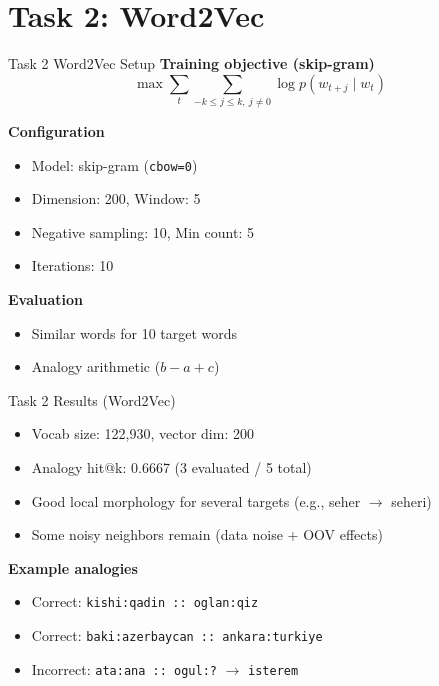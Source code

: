 \documentclass{beamer}
\begin{document}
\section{Task 2: Word2Vec}

\begin{frame}{Task 2 Word2Vec Setup}
\small
\textbf{Training objective (skip-gram)}
\[
\max \sum_{t}\sum_{-k \le j \le k,\ j\neq0} \log p(w_{t+j}\mid w_t)
\]

\vspace{0.4em}
\textbf{Configuration}
\begin{itemize}
  \item Model: skip-gram (\texttt{cbow=0})
  \item Dimension: 200, Window: 5
  \item Negative sampling: 10, Min count: 5
  \item Iterations: 10
\end{itemize}

\textbf{Evaluation}
\begin{itemize}
  \item Similar words for 10 target words
  \item Analogy arithmetic (\(b-a+c\))
\end{itemize}
\end{frame}

\begin{frame}{Task 2 Results (Word2Vec)}
\small
\begin{itemize}
  \item Vocab size: 122,930, vector dim: 200
  \item Analogy hit@k: 0.6667 (3 evaluated / 5 total)
  \item Good local morphology for several targets (e.g., seher $\rightarrow$ seheri)
  \item Some noisy neighbors remain (data noise + OOV effects)
\end{itemize}

\vspace{0.3em}
\textbf{Example analogies}
\begin{itemize}
  \item Correct: \texttt{kishi:qadin :: oglan:qiz}
  \item Correct: \texttt{baki:azerbaycan :: ankara:turkiye}
  \item Incorrect: \texttt{ata:ana :: ogul:?} $\rightarrow$ \texttt{isterem}
\end{itemize}
\end{frame}
\end{document}
